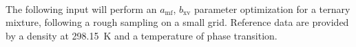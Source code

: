 \documentclass{scrartcl}
\newcommand{\amf}{a_\mathrm{mf}}
\newcommand{\bxv}{b_\mathrm{xv}}
\begin{document}
\

%
%
%
%
%
%

The following input will perform an $\amf$, $\bxv$ parameter optimization for a ternary mixture, following a rough sampling on a small grid.
Reference data are provided by a density at \SI{298.15}{K} and a temperature of phase transition.

\
\end{document}
